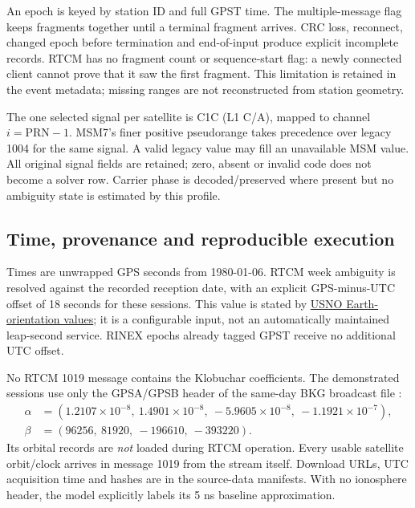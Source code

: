 An epoch is keyed by station ID and full GPST time. The multiple-message flag
keeps fragments together until a terminal fragment arrives. CRC loss, reconnect,
changed epoch before termination and end-of-input produce explicit incomplete
records. RTCM has no fragment count or sequence-start flag: a newly connected
client cannot prove that it saw the first fragment. This limitation is retained
in the event metadata; missing ranges are not reconstructed from station geometry.

The one selected signal per satellite is C1C (L1 C/A), mapped to channel
$i=\mathrm{PRN}-1$. MSM7's finer positive pseudorange takes precedence over
legacy 1004 for the same signal. A valid legacy value may fill an unavailable
MSM value. All original signal fields are retained; zero, absent or invalid code
does not become a solver row. Carrier phase is decoded/preserved where present
but no ambiguity state is estimated by this profile.

\clearpage
\subsection{Time, provenance and reproducible execution}
Times are unwrapped GPS seconds from 1980-01-06. RTCM week ambiguity is resolved
against the recorded reception date, with an explicit GPS-minus-UTC offset of
18 seconds for these sessions. This value is stated by
\href{https://maia.usno.navy.mil/information/eo-values}{USNO Earth-orientation values};
it is a configurable input, not an automatically maintained leap-second service.
RINEX epochs already tagged GPST receive no additional UTC offset.

No RTCM 1019 message contains the Klobuchar coefficients. The demonstrated
sessions use only the GPSA/GPSB header of the same-day BKG broadcast file
:
\begin{align}
\alpha&=(1.2107\!\times\!10^{-8},\ 1.4901\!\times\!10^{-8},\
 -5.9605\!\times\!10^{-8},\ -1.1921\!\times\!10^{-7}),\\
\beta&=(96256,\ 81920,\ -196610,\ -393220).
\end{align}
Its orbital records are \emph{not} loaded during RTCM operation. Every usable
satellite orbit/clock arrives in message 1019 from the stream itself. Download
URLs, UTC acquisition time and hashes are in the source-data manifests. With no
ionosphere header, the model explicitly labels its 5 ns baseline approximation.

